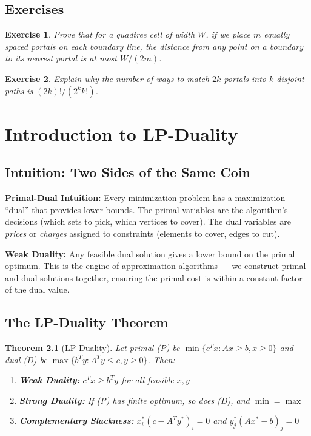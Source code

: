 \documentclass[11pt,oneside]{book}
\newtheorem{theorem}{Theorem}[chapter]
\newtheorem{exercise}[theorem]{Exercise}
\begin{document}
\section{Exercises}
\begin{exercise}
Prove that for a quadtree cell of width $W$, if we place $m$ equally spaced portals on each boundary line, the distance from any point on a boundary to its nearest portal is at most $W / (2m)$.
\end{exercise}
\begin{exercise}
Explain why the number of ways to match $2k$ portals into $k$ disjoint paths is $(2k)! / (2^k k!)$.
\end{exercise}

\setcounter{chapter}{11}
\chapter{Introduction to LP-Duality}
\label{ch:lp_duality}

\section{Intuition: Two Sides of the Same Coin}

\begin{intuitionbox}
\textbf{Primal-Dual Intuition:} Every minimization problem has a maximization ``dual'' that provides lower bounds. The primal variables are the algorithm's decisions (which sets to pick, which vertices to cover). The dual variables are \emph{prices} or \emph{charges} assigned to constraints (elements to cover, edges to cut).

\textbf{Weak Duality:} Any feasible dual solution gives a lower bound on the primal optimum. This is the engine of approximation algorithms — we construct primal and dual solutions together, ensuring the primal cost is within a constant factor of the dual value.
\end{intuitionbox}

\section{The LP-Duality Theorem}

\begin{theorem}[LP Duality]
Let primal (P) be $\min \{c^T x : Ax \geq b, x \geq 0\}$ and dual (D) be $\max \{b^T y : A^T y \leq c, y \geq 0\}$. Then:
\begin{enumerate}
    \item \textbf{Weak Duality:} $c^T x \geq b^T y$ for all feasible $x, y$
    \item \textbf{Strong Duality:} If (P) has finite optimum, so does (D), and $\min = \max$
    \item \textbf{Complementary Slackness:} $x_i^* (c - A^T y^*)_i = 0$ and $y_j^* (A x^* - b)_j = 0$
\end{enumerate}
\end{theorem}
\end{document}
